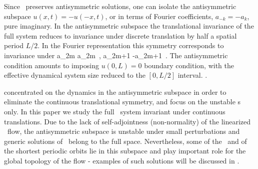 Since \KSe\ preserves
antisymmetric solutions, one can isolate the antisymmetric
subspace
$u(x,t)=-u(-x,t)$, or in terms of Fourier coefficients,
$a_{-k}= - a_k$, pure imaginary.
In the antisymmetric subspace the translational
invariance of the full system reduces
to invariance under discrete translation
 by half a spatial period $L/2$.
In the Fourier representation  this
symmetry corresponds to invariance under
\beq
a_{2m} \to a_{2m}
    \,,\qquad
a_{2m+1} \to -a_{2m+1}
\,.
The antisymmetric condition amounts to imposing
$u(0,L)=0$ boundary condition, with
the effective dynamical system size reduced to
the $[0, L/2]$ interval.
.


 concentrated on
the dynamics in the antisymmetric subspace in
order to eliminate
the continuous translational symmetry, and focus on the
unstable \po s only.
In this paper we study the full \KS\ system invariant
under continuous translations. Due to the lack of self-adjointness
(non-normality) of the linearized \KS\ flow,
the antisymmetric subspace
is unstable under small perturbations and generic solutions of
\KSe\ belong to the full space. Nevertheless, some of
the \eqva\ and of the shortest periodic orbits lie in this subspace
and play important role for the global topology of the flow - examples
of such solutions will be discussed in .

